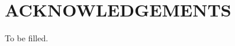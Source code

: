 %
%
%


\chapter*{\texorpdfstring{\MakeUppercase{ACKNOWLEDGEMENTS}}{ACKNOWLEDGEMENTS}}



To be filled.

\pagebreak{}
